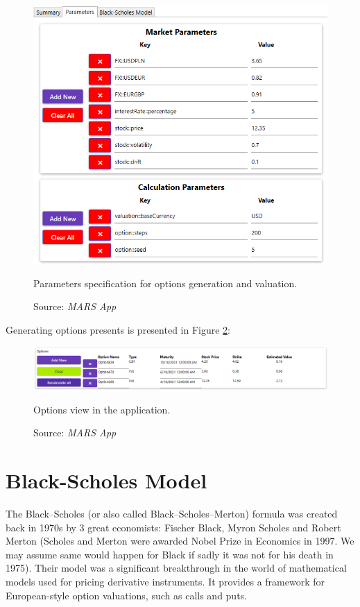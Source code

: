     \begin{figure}[H]
            \centering
            \includegraphics[width=\textwidth]{img/specifyParameters.png}
            \caption{Parameters specification for options generation and valuation.}
            \caption*{Source: \textit{MARS App}}
            \label{fig:parametersPresentation}
    \end{figure}
    \noindent
    Generating options presents is presented in Figure \ref{fig:optionsPresentation}:
    \begin{figure}[H]
            \centering
            \includegraphics[width=\textwidth]{img/optionsPresentation.png}
            \caption{Options view in the application.}
            \caption*{Source: \textit{MARS App}}
            \label{fig:optionsPresentation}
    \end{figure}
\section{Black-Scholes Model}   
    The Black--Scholes (or also called Black--Scholes--Merton) formula was created back in 1970s by 3 great economists: Fischer Black, Myron Scholes and Robert Merton (Scholes and Merton were awarded Nobel Prize in Economics in 1997. We may assume same would happen for Black if sadly it was not for his death in 1975).
    Their model was a significant breakthrough in the world of mathematical models used for pricing derivative instruments. It provides a framework for European-style option valuations, such as calls and puts.
    
